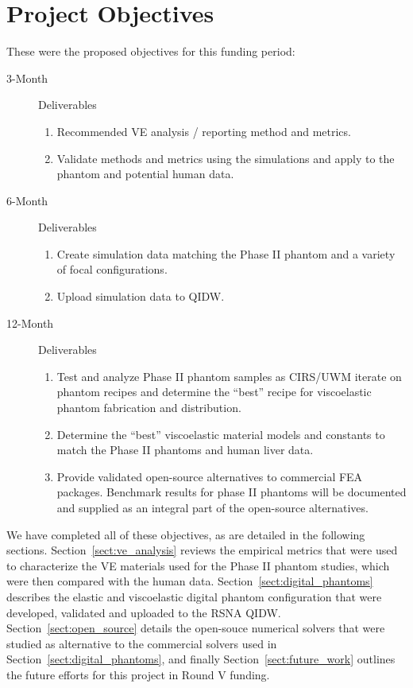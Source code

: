 \section{Project Objectives}

These were the proposed objectives for this funding period:

\begin{description}
    \item[3-Month] Deliverables
        \begin{enumerate}
            \item Recommended VE analysis / reporting method and metrics. 
            \item Validate methods and metrics using the simulations and apply
                to the phantom and potential human data.
        \end{enumerate}

    \item[6-Month] Deliverables
        \begin{enumerate}
            \item Create simulation data matching the Phase II phantom and a
                variety of focal configurations.
            \item Upload simulation data to QIDW\@.
        \end{enumerate}

    \item[12-Month] Deliverables
        \begin{enumerate}
            \item Test and analyze Phase II phantom samples as CIRS/UWM iterate
                on phantom recipes and determine the “best” recipe for
                viscoelastic phantom fabrication and distribution.
            \item Determine the ``best'' viscoelastic material models and
                constants to match the Phase II phantoms and human liver data.
            \item Provide validated open-source alternatives to commercial FEA
                packages. Benchmark results for phase II phantoms will be
                documented and supplied as an integral part of the open-source
                alternatives.
        \end{enumerate}

\end{description}

We have completed all of these objectives, as are detailed in the following
sections.  Section~\ref{sect:ve_analysis} reviews the empirical metrics that
were used to characterize the VE materials used for the Phase II phantom
studies, which were then compared with the human data.
Section~\ref{sect:digital_phantoms} describes the elastic and viscoelastic
digital phantom configuration that were developed, validated and uploaded to
the RSNA QIDW\@.  Section~\ref{sect:open_source} details the open-souce numerical
solvers that were studied as alternative to the commercial solvers used in
Section~\ref{sect:digital_phantoms}, and finally Section~\ref{sect:future_work}
outlines the future efforts for this project in Round V funding.
